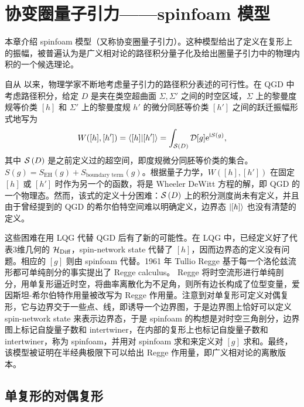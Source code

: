 
\chapter{协变圈量子引力——spinfoam 模型}

	本章介绍 spinfoam 模型（又称协变圈量子引力）。这种模型给出了定义在复形上的振幅，被普遍认为是广义相对论的路径积分量子化及给出圈量子引力中的物理内积的一个候选理论。

	自从 \cite{Misner1957} 以来，物理学家不断地考虑量子引力的路径积分表述的可行性。在 QGD 中考虑路径积分，给定 $D$ 是夹在类空超曲面 $\Sigma,\Sigma'$ 之间的时空区域，$\Sigma$ 上的黎曼度规等价类 $[h]$ 和 $\Sigma'$ 上的黎曼度规 $h'$ 的微分同胚等价类 $[h']$ 之间的跃迁振幅形式地写为
	\begin{equation}
		W([h],[h']) = \ip{[h]}{[h']} = \int_{\superspace{D}} \mathcal{D}[g] \e{\ii S(g)},\label{eq-GR_path_integral}
	\end{equation}
	其中 $\mathcal{S}\left(D\right)$ 是之前定义过的超空间，即度规微分同胚等价类的集合。$S(g) = S_{\text{EH}}(g) + S_{\text{boundary term}}(g)$。根据量子力学，$W([h],[h'])$ 在固定 $[h]$ 或 $[h']$ 时作为另一个的函数，将是 Wheeler DeWitt 方程的解，即 QGD 的一个物理态。然而，该式的定义十分困难：$\mathcal{S}\left(D\right)$ 上的积分测度尚未有定义，并且由于曾经提到的 QGD 的希尔伯特空间难以明确定义，边界态 $\ket{[h]}$ 也没有清楚的定义。

	这些困难在用 LQG 代替 QGD 后有了新的可能性。在 LQG 中，已经定义好了代表3维几何的 $\mathcal{H}_{\text{Diff}}$，spin-network state 代替了 $[h]$，因而边界态的定义没有问题。相应的 $[g]$ 则由 spinfoam 代替。1961 年 Tullio Regge 基于每一个洛伦兹流形都可单纯剖分的事实提出了 Regge calculus\cite{Regge1961}。
	Regge 将时空流形进行单纯剖分，用单复形逼近时空，将曲率离散化为不足角，则所有边长构成了位型变量，爱因斯坦-希尔伯特作用量被改写为 Regge 作用量。注意到对单复形可定义对偶复形，它与边界交于一些点、线，即诱导一个边界图，于是边界图上恰好可以定义 spin-network state 来表示边界态，于是 spinfoam 的构想是对时空三角剖分，边界图上标记自旋量子数和 intertwiner，在内部的复形上也标记自旋量子数和 intertwiner，称为 spinfoam，并用对 spinfoam 求和来定义对 $[g]$ 求和。最终，该模型被证明在半经典极限下可以给出 Regge 作用量，即广义相对论的离散版本。

	\section{单复形的对偶复形}

